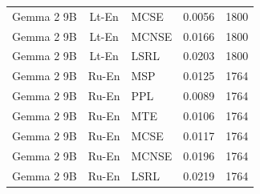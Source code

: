\begin{table}
\begin{tabular}{lc}
Gemma 2 9B & Lt-En & MCSE & 0.0056 & 1800 \\
Gemma 2 9B & Lt-En & MCNSE & 0.0166 & 1800 \\
Gemma 2 9B & Lt-En & LSRL & 0.0203 & 1800 \\
Gemma 2 9B & Ru-En & MSP & 0.0125 & 1764 \\
Gemma 2 9B & Ru-En & PPL & 0.0089 & 1764 \\
Gemma 2 9B & Ru-En & MTE & 0.0106 & 1764 \\
Gemma 2 9B & Ru-En & MCSE & 0.0117 & 1764 \\
Gemma 2 9B & Ru-En & MCNSE & 0.0196 & 1764 \\
Gemma 2 9B & Ru-En & LSRL & 0.0219 & 1764 \\
\midrule
\end{tabular}
\end{table}
